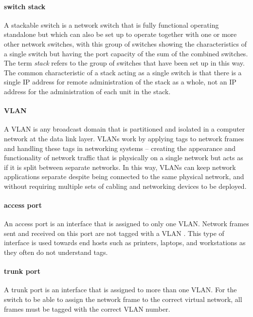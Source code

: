 \paragraph{switch stack}
A stackable switch is a network switch that is fully functional operating standalone but which can also be set up to operate together with one or more other network switches, with this group of switches showing the characteristics of a single switch but having the port capacity of the sum of the combined switches.
The term \emph{stack} refers to the group of switches that have been set up in this way.
The common characteristic of a stack acting as a single switch is that there is a single \acs{IP} address for remote administration of the stack as a whole, not an \acs{IP} address for the administration of each unit in the stack.

\paragraph{\acs{VLAN}}
A \acf{VLAN} is any broadcast domain that is partitioned and isolated in a computer network at the data link layer.
\acp{VLAN} work by applying tags to network frames and handling these tags in networking systems -- creating the appearance and functionality of network traffic that is physically on a single network but acts as if it is split between separate networks.
In this way, \acp{VLAN} can keep network applications separate despite being connected to the same physical network, and without requiring multiple sets of cabling and networking devices to be deployed.


\paragraph{access port}
An access port is an interface that is assigned to only one \acs{VLAN}.
Network frames sent and received on this port are not tagged with a \acs{VLAN} .
This type of interface is used towards end hosts such as printers, laptops, and workstations as they often do not understand  tags.


\paragraph{trunk port}
A trunk port is an interface that is assigned to more than one \acs{VLAN}.
For the switch to be able to assign the network frame to the correct virtual network, all frames must be tagged with the correct \acs{VLAN} number.

